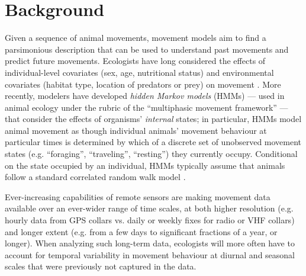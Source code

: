 \documentclass{bmcart}
\begin{document}


\doublespacing

\section*{Background}

Given a sequence of animal movements, movement models aim to find a parsimonious description
that can be used to understand past movements and predict
future movements. Ecologists have long considered the effects of
individual-level covariates (sex, age, nutritional status) and
environmental covariates (habitat type, location of predators or prey)
on movement \cite{patterson2008state, mckenzie2009first, pal1998dispersal}. 
More recently, modelers have developed
\emph{hidden Markov models} (HMMs)
\cite{firle_influence_1998,nathan_movement_2008,langrock_flexible_2012} %
--- used in animal ecology under the rubric of the ``multiphasic movement
framework'' \cite{fryxell_multiple_2008} --- that consider the effects
of organisms' \emph{internal} states; in particular, HMMs model animal
movement as though individual animals' movement behaviour 
at particular times is determined
by which of a discrete set of unobserved movement states
(e.g. ``foraging'', ``traveling'', ``resting'') they currently occupy.
Conditional on the state occupied by an individual, HMMs typically
assume that animals follow a standard correlated random walk model
\cite{okubo_diffusion_1980,turchin1998quantitative}.


Ever-increasing capabilities of remote
sensors are making movement data available over an
ever-wider range of time scales, at both higher resolution (e.g. hourly data
from GPS collars vs. daily or weekly fixes for radio or VHF
collars) and longer extent (e.g. from a few days to significant
fractions of a year, or longer).  When analyzing such
long-term data, ecologists will more
often have to account for temporal variability in movement
behaviour at diurnal and seasonal scales that were previously
not captured in the data.
\end{document}
